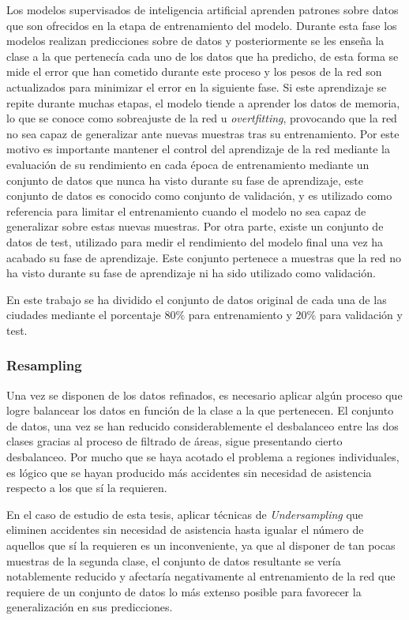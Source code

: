 Los modelos supervisados de inteligencia artificial aprenden patrones sobre datos que son ofrecidos en la etapa de entrenamiento del modelo. Durante esta fase los modelos realizan predicciones sobre de datos y posteriormente se les enseña la clase a la que pertenecía cada uno de los datos que ha predicho, de esta forma se mide el error que han cometido durante este proceso y los pesos de la red son actualizados para minimizar el error en la siguiente fase. Si este aprendizaje se repite durante muchas etapas, el modelo tiende a aprender los datos de memoria, lo que se conoce como sobreajuste de la red u \textit{overtfitting}, provocando que la red no sea capaz de generalizar ante nuevas muestras tras su entrenamiento. Por este motivo es importante mantener el control del aprendizaje de la red mediante la evaluación de su rendimiento en cada época de entrenamiento mediante un conjunto de datos que nunca ha visto durante su fase de aprendizaje, este conjunto de datos es conocido como conjunto de validación, y es utilizado como referencia para limitar el entrenamiento cuando el modelo no sea capaz de generalizar sobre estas nuevas muestras. Por otra parte, existe un conjunto de datos de test, utilizado para medir el rendimiento del modelo final una vez ha acabado su fase de aprendizaje. Este conjunto pertenece a muestras que la red no ha visto durante su fase de aprendizaje ni ha sido utilizado como validación.

En este trabajo se ha dividido el conjunto de datos original de cada una de las ciudades mediante el porcentaje $80\%$ para entrenamiento y $20\%$ para validación y test.


\subsubsection{Resampling}

Una vez se disponen de los datos refinados, es necesario aplicar algún proceso que logre balancear los datos en función de la clase a la que pertenecen. El conjunto de datos, una vez se han reducido considerablemente el desbalanceo entre las dos clases gracias al proceso de filtrado de áreas, sigue presentando cierto desbalanceo. Por mucho que se haya acotado el problema a regiones individuales, es lógico que se hayan producido más accidentes sin necesidad de asistencia respecto a los que sí la requieren.

En el caso de estudio de esta tesis, aplicar técnicas de \textit{Undersampling} que eliminen accidentes sin necesidad de asistencia hasta igualar el número de aquellos que sí la requieren es un inconveniente, ya que al disponer de tan pocas muestras de la segunda clase, el conjunto de datos resultante se vería notablemente reducido y afectaría negativamente al entrenamiento de la red que requiere de un conjunto de datos lo más extenso posible para favorecer la generalización en sus predicciones.

